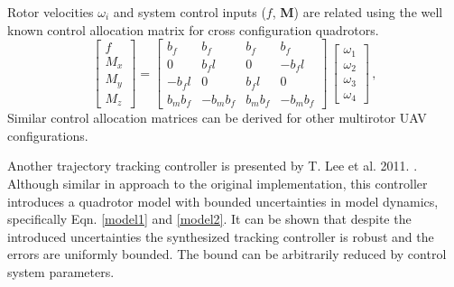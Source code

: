 \noindent Rotor velocities $\omega_i$ and system control inputs ($f$, \textbf{M}) are related using the well known control allocation matrix for cross configuration quadrotors.
\begin{equation}
       \begin{bmatrix}
               f \\
               M_x \\
               M_y \\
               M_z
       \end{bmatrix} = 
       \begin{bmatrix}
               b_f     &       b_f     &       b_f     &       b_f     \\
               0       &       b_f l   &       0       & -b_f l \\
               -b_f l  &       0       &       b_f l   &       0       \\
               b_m b_f &       -b_m b_f        & b_m b_f       & -b_m b_f
       \end{bmatrix} \,
       \begin{bmatrix}
               \omega_1 \\
               \omega_2 \\
               \omega_3 \\
               \omega_4
       \end{bmatrix} \, ,
\end{equation}
\noindent Similar control allocation matrices can be derived for other multirotor UAV configurations.

Another trajectory tracking controller is presented by T. Lee et al. 2011. \cite{LeeClanak3}. Although similar in approach to the original implementation, this controller introduces a quadrotor model with bounded uncertainties in model dynamics, specifically Eqn. \ref{model1} and \ref{model2}. It can be shown that despite the introduced uncertainties the synthesized tracking controller is robust and the errors are uniformly bounded. The bound can be arbitrarily reduced by control system parameters. 

